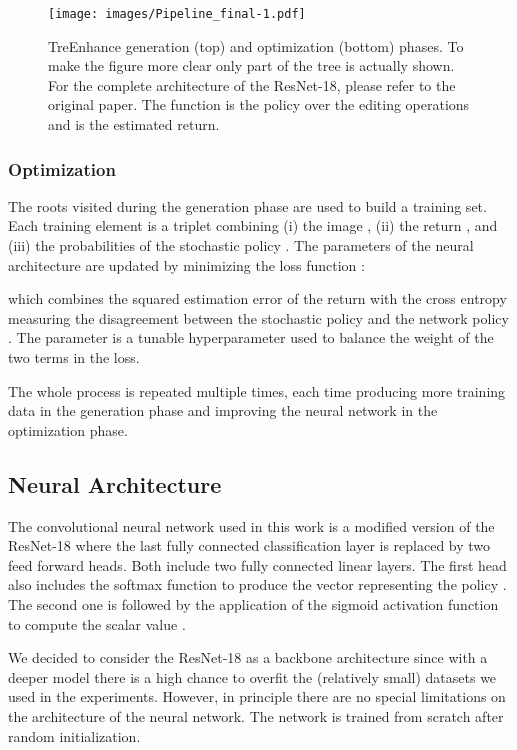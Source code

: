 \documentclass[3p,twocolumn]{elsarticle}
\newcommand{\method}[0]{TreEnhance}
\begin{document}
\begin{figure}[t]
\centering
\texttt{[image: images/Pipeline\_final-1.pdf]}
\caption{\method{} generation (top) and optimization (bottom) phases. To make the figure more clear only part of the tree is actually shown. For the complete architecture of the ResNet-18, please refer to the original paper. The function  is the policy over the editing operations and  is the estimated return.}
\label{fig:pipeline}
\end{figure}




\subsubsection{Optimization}
The roots visited during the generation phase are used to build a training set.
Each training element is a triplet combining (i) the image , (ii) the return , and (iii) the probabilities of the stochastic policy . The parameters of the neural architecture are updated by minimizing the loss function :

which combines the squared estimation error of the return with the cross entropy measuring the disagreement between the stochastic policy  and the network policy . The parameter  is a tunable hyperparameter used to balance the weight of the two terms in the loss.

The whole process is repeated multiple times, each time producing more training data in the generation phase and improving the neural network in the optimization phase. 

\subsection{Neural Architecture}

The convolutional neural network used in this work 
is a modified version of the ResNet-18 where the last fully connected classification layer is replaced by two feed forward heads. Both include two fully connected linear layers. The first head also includes the softmax function to produce the vector representing the policy . The second one is followed by the application of the sigmoid activation function to compute the scalar value .   

We decided to consider the ResNet-18 as a backbone architecture since with a deeper model there is a high chance to overfit the (relatively small) datasets we used in the experiments. However, in principle there are no special limitations on the architecture of the neural network. 
The network is trained from scratch after random initialization.
\end{document}
